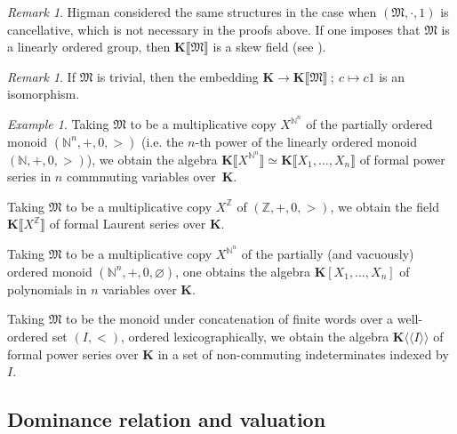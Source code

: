 \documentclass{article}
\newcommand{\llangle}{{\langle\!\langle}}
\newcommand{\rrangle}{{\rangle\!\rangle}}
\theoremstyle{remark}\newtheorem*{convention*}{Convention}
\newtheorem{example}[theorem]{Example}
\newtheorem{remark}[theorem]{Remark}
\begin{document}
\begin{remark}
  Higman {\cite[Section~5]{Hig52}} considered the same structures in the case
  when $(\mathfrak{M}, \cdot, 1)$ is cancellative, which is not necessary in
  the proofs above. If one imposes that $\mathfrak{M}$ is a linearly ordered
  group, then $\mathbf{K} \llbracket \mathfrak{M} \rrbracket$ is a skew field
  (see {\cite[Chapter~2]{Cohn:skew}}).
\end{remark}

\begin{remark}
  If $\mathfrak{M}$ is trivial, then the embedding $\mathbf{K} \longrightarrow
  \mathbf{K} \llbracket \mathfrak{M} \rrbracket \: ; \: c \mapsto c 1$ is an
  isomorphism.
\end{remark}

\begin{example}
  Taking $\mathfrak{M}$ to be a multiplicative copy $X^{\mathbb{N}^n}$ of the
  partially ordered monoid $(\mathbb{N}^n, +, 0, >)$ (i.e. the $n$-th power of
  the linearly ordered monoid $(\mathbb{N}, +, 0, >)$), we obtain the algebra
  $\mathbf{K} \llbracket X^{\mathbb{N}^n} \rrbracket \simeq \mathbf{K}
  \llbracket X_1, \ldots, X_n \rrbracket$ of formal power series in $n$
  commmuting variables over~$\mathbf{K}$.
  
  Taking $\mathfrak{M}$ to be a multiplicative copy $X^{\mathbb{Z}}$ of
  $(\mathbb{Z}, +, 0, >)$, we obtain the field $\mathbf{K} \llbracket
  X^{\mathbb{Z}} \rrbracket$ of formal Laurent series over $\mathbf{K}$.
  
  Taking $\mathfrak{M}$ to be a multiplicative copy $X^{\mathbb{N}^n}$ of the
  partially (and vacuously) ordered monoid $(\mathbb{N}^n, +, 0,
  \varnothing)$, one obtains the algebra $\mathbf{K} [X_1, \ldots, X_n]$ of
  polynomials in $n$ variables over $\mathbf{K}$.
  
  Taking $\mathfrak{M}$ to be the monoid under concatenation of finite words
  over a well-ordered set $(I, <)$, ordered lexicographically, we obtain the
  algebra $\mathbf{K} \llangle I \rrangle$ of formal power series over
  $\mathbf{K}$ in a set of non-commuting indeterminates indexed by $I$.
\end{example}

\subsection{Dominance relation and valuation}
\end{document}

